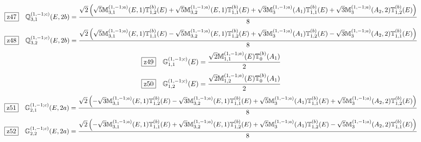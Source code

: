 \documentclass[fleqn,10pt,landscape]{jsarticle}
\begin{document}
\begin{dmath*}
\hspace*{3mm}\fbox{z47}\quad \mathbb{Q}_{3,1}^{(1,-1;c)}(E,2b)=\frac{\sqrt{2} \left(\sqrt{5} \mathbb{M}_{3,1}^{(1,-1;a)}(E,1) \mathbb{T}_{1,2}^{(b)}(E) + \sqrt{5} \mathbb{M}_{3,2}^{(1,-1;a)}(E,1) \mathbb{T}_{1,1}^{(b)}(E) + \sqrt{3} \mathbb{M}_{3}^{(1,-1;a)}(A_{1}) \mathbb{T}_{1,1}^{(b)}(E) + \sqrt{3} \mathbb{M}_{3}^{(1,-1;a)}(A_{2},2) \mathbb{T}_{1,2}^{(b)}(E)\right)}{8}
\end{dmath*}
\begin{dmath*}
\hspace*{3mm}\fbox{z48}\quad \mathbb{Q}_{3,2}^{(1,-1;c)}(E,2b)=\frac{\sqrt{2} \left(\sqrt{5} \mathbb{M}_{3,1}^{(1,-1;a)}(E,1) \mathbb{T}_{1,1}^{(b)}(E) - \sqrt{5} \mathbb{M}_{3,2}^{(1,-1;a)}(E,1) \mathbb{T}_{1,2}^{(b)}(E) + \sqrt{3} \mathbb{M}_{3}^{(1,-1;a)}(A_{1}) \mathbb{T}_{1,2}^{(b)}(E) - \sqrt{3} \mathbb{M}_{3}^{(1,-1;a)}(A_{2},2) \mathbb{T}_{1,1}^{(b)}(E)\right)}{8}
\end{dmath*}
\begin{dmath*}
\hspace*{3mm}\fbox{z49}\quad \mathbb{G}_{1,1}^{(1,-1;c)}(E)=\frac{\sqrt{2} \mathbb{M}_{1,1}^{(1,-1;a)}(E) \mathbb{T}_{0}^{(b)}(A_{1})}{2}
\end{dmath*}
\begin{dmath*}
\hspace*{3mm}\fbox{z50}\quad \mathbb{G}_{1,2}^{(1,-1;c)}(E)=\frac{\sqrt{2} \mathbb{M}_{1,2}^{(1,-1;a)}(E) \mathbb{T}_{0}^{(b)}(A_{1})}{2}
\end{dmath*}
\begin{dmath*}
\hspace*{3mm}\fbox{z51}\quad \mathbb{G}_{2,1}^{(1,-1;c)}(E,2a)=\frac{\sqrt{2} \left(- \sqrt{3} \mathbb{M}_{3,1}^{(1,-1;a)}(E,1) \mathbb{T}_{1,2}^{(b)}(E) - \sqrt{3} \mathbb{M}_{3,2}^{(1,-1;a)}(E,1) \mathbb{T}_{1,1}^{(b)}(E) + \sqrt{5} \mathbb{M}_{3}^{(1,-1;a)}(A_{1}) \mathbb{T}_{1,1}^{(b)}(E) + \sqrt{5} \mathbb{M}_{3}^{(1,-1;a)}(A_{2},2) \mathbb{T}_{1,2}^{(b)}(E)\right)}{8}
\end{dmath*}
\begin{dmath*}
\hspace*{3mm}\fbox{z52}\quad \mathbb{G}_{2,2}^{(1,-1;c)}(E,2a)=\frac{\sqrt{2} \left(- \sqrt{3} \mathbb{M}_{3,1}^{(1,-1;a)}(E,1) \mathbb{T}_{1,1}^{(b)}(E) + \sqrt{3} \mathbb{M}_{3,2}^{(1,-1;a)}(E,1) \mathbb{T}_{1,2}^{(b)}(E) + \sqrt{5} \mathbb{M}_{3}^{(1,-1;a)}(A_{1}) \mathbb{T}_{1,2}^{(b)}(E) - \sqrt{5} \mathbb{M}_{3}^{(1,-1;a)}(A_{2},2) \mathbb{T}_{1,1}^{(b)}(E)\right)}{8}
\end{dmath*}
\end{document}
